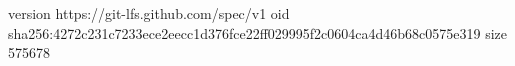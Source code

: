 version https://git-lfs.github.com/spec/v1
oid sha256:4272c231c7233ece2eecc1d376fce22ff029995f2c0604ca4d46b68c0575e319
size 575678
